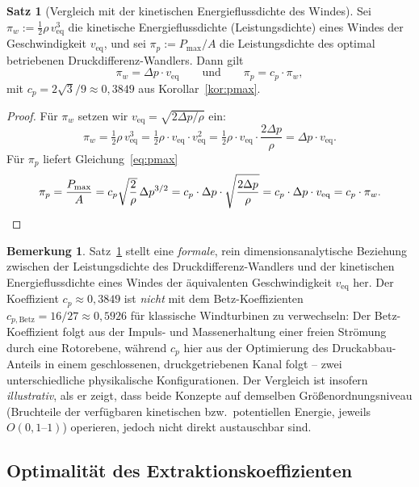 ﻿\documentclass[a4paper,12pt]{article}
\theoremstyle{definition}
\newtheorem{satz}{Satz}
\newtheorem{bemerkung}{Bemerkung}
\begin{document}
\begin{satz}[Vergleich mit der kinetischen Energieflussdichte des Windes]
	\label{satz:vergleich_wind}
	Sei $\pi_w := \tfrac{1}{2}\rho\, v_{\mathrm{eq}}^3$ die kinetische
	Energieflussdichte (Leistungsdichte) eines Windes der Geschwindigkeit
	$v_{\mathrm{eq}}$, und sei $\pi_p := P_{\max}/A$ die
	Leistungsdichte des optimal betriebenen Druckdifferenz-Wandlers.
	Dann gilt
	\[
		\pi_w = \Delta p \cdot v_{\mathrm{eq}}
		\qquad\text{und}\qquad
		\pi_p = c_p \cdot \pi_w,
	\]
	mit $c_p = 2\sqrt{3}/9 \approx 0{,}3849$ aus
	Korollar~\ref{kor:pmax}.
\end{satz}

\begin{proof}
	Für $\pi_w$ setzen wir $v_{\mathrm{eq}} = \sqrt{2\Delta p/\rho}$ ein:
	\[
		\pi_w = \tfrac{1}{2}\rho\, v_{\mathrm{eq}}^3
		= \tfrac{1}{2}\rho \cdot v_{\mathrm{eq}} \cdot v_{\mathrm{eq}}^2
		= \tfrac{1}{2}\rho \cdot v_{\mathrm{eq}} \cdot \frac{2\Delta p}{\rho}
		= \Delta p \cdot v_{\mathrm{eq}}.
	\]
	Für $\pi_p$ liefert Gleichung~\eqref{eq:pmax}
	\[
		\pi_p = \frac{P_{\max}}{A}
		= c_p \sqrt{\frac{2}{\rho}}\, \Delta p^{3/2}
		= c_p \cdot \Delta p \cdot \sqrt{\frac{2\Delta p}{\rho}}
		= c_p \cdot \Delta p \cdot v_{\mathrm{eq}}
		= c_p \cdot \pi_w. \qedhere
	\]
\end{proof}

\begin{bemerkung}
	\label{bem:betz}
	Satz~\ref{satz:vergleich_wind} stellt eine \emph{formale}, rein
	dimensionsanalytische Beziehung zwischen der Leistungsdichte des
	Druckdifferenz-Wandlers und der kinetischen Energieflussdichte eines
	Windes der äquivalenten Geschwindigkeit $v_{\mathrm{eq}}$ her. Der
	Koeffizient $c_p \approx 0{,}3849$ ist \emph{nicht} mit dem
	Betz-Koeffizienten $c_{p,\mathrm{Betz}} = 16/27 \approx 0{,}5926$ für
	klassische Windturbinen zu verwechseln: Der Betz-Koeffizient folgt
	aus der Impuls- und Massenerhaltung einer freien Strömung durch eine
	Rotorebene, während $c_p$ hier aus der Optimierung des
	Druckabbau-Anteils in einem geschlossenen, druckgetriebenen Kanal
	folgt -- zwei unterschiedliche physikalische Konfigurationen. Der
	Vergleich ist insofern \emph{illustrativ}, als er zeigt, dass beide
	Konzepte auf demselben Größenordnungsniveau (Bruchteile der
	verfügbaren kinetischen bzw.\ potentiellen Energie, jeweils
	$O(0{,}1\text{--}1)$) operieren, jedoch nicht direkt austauschbar
	sind.
\end{bemerkung}

\subsection{Optimalität des Extraktionskoeffizienten}
\end{document}
